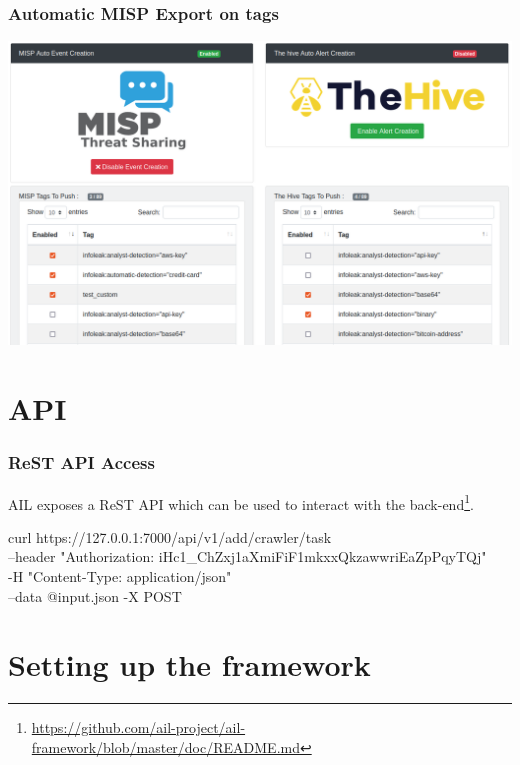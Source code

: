 \documentclass[10pt,aspectratio=169, colorlinks=true, linkcolor=circlBlue]{beamer}
\begin{document}
\begin{frame}
    \frametitle{Automatic MISP Export on tags}
    \centerline{\includegraphics[scale=0.25]{screenshot/tags_misp_auto.png}}
\end{frame}


\section{API}

\begin{frame}
    \frametitle{ReST API Access}

    AIL exposes a ReST API which can be used to interact with the back-end\footnote{\url{https://github.com/ail-project/ail-framework/blob/master/doc/README.md}}.

    \vspace{0.5cm}

    \begin{flushleft}
    \scriptsize
    \ttfamily
    curl https://127.0.0.1:7000/api/v1/add/crawler/task \\
    \hspace*{1em}--header "Authorization: iHc1\_ChZxj1aXmiFiF1mkxxQkzawwriEaZpPqyTQj" \\
    \hspace*{1em}-H "Content-Type: application/json" \\
    \hspace*{1em}--data @input.json -X POST
    \end{flushleft}
\end{frame}

\section{Setting up the framework}
\end{document}
